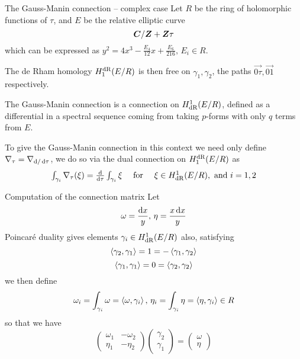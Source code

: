 \begin{frame}{The Gauss-Manin connection -- complex case}
    Let $R$ be the ring of holomorphic functions of $\tau$, and $E$ be the relative elliptic curve
    \[\bm C/ \bm{Z} + \bm{Z} \tau\]
    which can be expressed as 
    $y^{2}=4 x^{3}-\frac{E_4}{12} x+\frac{E_{6}}{216},\,E_i \in R$.\pause

    The de Rham homology $H^{\mathrm{dR}}_1(E/R)$ is then free on $\gamma_1,\gamma_2$, the paths $\overset{\to}{0\tau},\overset{\to}{01}$ respectively.\pause

    The Gauss-Manin connection is a connection on $H^1_{\mathrm{dR}}(E/R)$, defined as a differential in a spectral sequence coming from taking $p$-forms with only $q$ terms from $E$.\pause

    To give the Gauss-Manin connection in this context we need only define
    \(\nabla_\tau = \nabla_{\mathop{}\!\mathrm{d}/\mathop{}\!\mathrm{d} \tau}\), we do so via the dual connection on $H_1^{\mathrm{dR}}(E/R)$ as
    \begin{equation*}
        \begin{array}{l}
            \int_{\gamma_{{i}}} \nabla_{\tau}(\xi)=\frac{{\mathop{}\!\mathrm{d}}}{{\mathop{}\!\mathrm{d}} \tau} \int_{\gamma_{i}} \xi \quad \text { for } \quad \xi \in {H}_{\mathrm{dR}}^{1}({E} / {R}), \text { and } i=1,2
        \end{array}
    \end{equation*}
\end{frame}

\begin{frame}{Computation of the connection matrix}
    Let
    \[ \omega = \frac{\mathop{}\!\mathrm{d} x}{y},\,\eta = \frac{x \mathop{}\!\mathrm{d} x}{y}\]
    Poincaré duality gives elements $\gamma_i \in H^1_{\mathrm{dR}}(E/R)$ also, satisfying
    \[\left\langle \gamma_2, \gamma_1 \right\rangle = 1 = -\left\langle \gamma_1, \gamma_2 \right\rangle \]
    \[\left\langle \gamma_1, \gamma_1 \right\rangle = 0 = \left\langle \gamma_2, \gamma_2 \right\rangle \]
    we then define
    \[ \omega_i  =\int_{\gamma_i} \omega = \left\langle \omega, \gamma_i \right\rangle,\,\eta_i = \int_{\gamma_i} \eta = \left\langle \eta, \gamma_i \right\rangle\in R\]
    so that we have
    $$
    \left(\begin{array}{cc}
            \omega_{1} & -\omega_{2} \\
            \eta_{1} & -\eta_{2}
            \end{array}\right)\left(\begin{array}{l}
            \gamma_{2} \\
            \gamma_{1}
            \end{array}\right)=\left(\begin{array}{l}
            \omega \\
            \eta
    \end{array}\right)
    $$
\end{frame}

